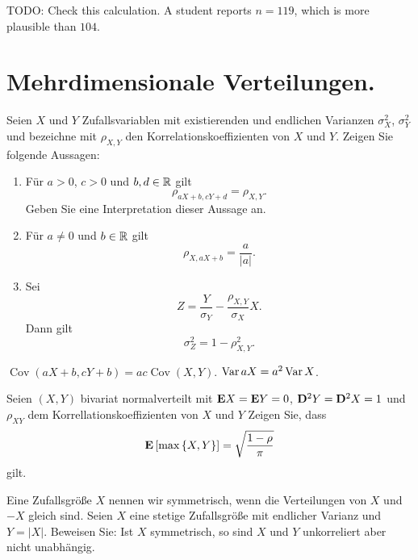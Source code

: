 TODO: Check this calculation. A student reports $n=119$, which is more
plausible than $104$. 


\section{Mehrdimensionale Verteilungen.}

 Seien $X$ und $Y$
Zufallsvariablen mit existierenden und endlichen Varianzen $\sigma^2_{X}$, $\sigma^2_{Y}$ und bezeichne mit
$\rho_{X,Y}$ den Korrelationskoeffizienten von $X$ und $Y$. Zeigen Sie folgende
Aussagen: 
\begin{enumerate}
    \item Für $a>0$, $c>0$ und $b,d\in\mathbb R$ gilt
        \begin{equation*}
            \rho_{aX + b, cY + d} = \rho_{X,Y}.
        \end{equation*}
        Geben Sie eine Interpretation dieser Aussage an. 
    \item Für $a\neq 0$ und $b\in\mathbb R$ gilt
        \begin{equation*}
            \rho_{X, aX+b} = \frac{a}{|a|}.
        \end{equation*}

    \item Sei
        \begin{equation*}
            Z = \frac{Y}{\sigma_{Y}} - \frac{\rho_{X,Y}}{\sigma_{X}} X.
        \end{equation*}
        Dann gilt
        \begin{equation*}
            \sigma^2_{Z} = 1 - \rho^{2}_{X,Y}.
        \end{equation*}
\end{enumerate}

\solution$\operatorname{Cov}(aX+b, cY + b)= ac
\operatorname{Cov}(X,Y)$. $\operatorname{Var} aX = a^2 \operatorname{Var} X$. 

 Seien $(X,Y)$ bivariat normalverteilt
mit $\mathbf E X=\mathbf E Y=0$, $\mathbf D^{2}Y=\mathbf D^{2}X=1$ und $\rho_{XY}$ dem Korrellationskoeffizienten
von $X$ und $Y$
Zeigen Sie, dass
\begin{equation*}
    \mathbf E \left[ \max\left\{ X,Y \right\} \right] = \sqrt{\frac{1-\rho}{\pi}}
\end{equation*}
gilt.

 Eine Zufallsgröße $X$ nennen wir
symmetrisch, wenn die Verteilungen von $X$ und $-X$ gleich sind. Seien $X$ eine
stetige Zufallsgröße mit endlicher Varianz und $Y = |X|$. Beweisen Sie: Ist $X$
symmetrisch, so sind $X$ und $Y$ unkorreliert aber nicht unabhängig.

